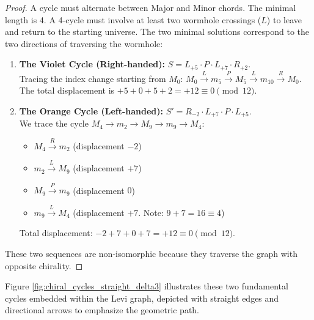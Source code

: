 \documentclass[12pt,letterpaper]{amsart}
\begin{document}
\begin{proof}
A cycle must alternate between Major and Minor chords. The minimal length is 4. A 4-cycle must involve at least two wormhole crossings (\texorpdfstring{$L$}{L}) to leave and return to the starting universe.
The two minimal solutions correspond to the two directions of traversing the wormhole:

\begin{enumerate}
    \item \textbf{The Violet Cycle (Right-handed):} $ S = L_{+5} \cdot P \cdot L_{+7} \cdot R_{+2} $.\\
    Tracing the index change starting from $M_0$: 
    $M_0 \xrightarrow{L} m_5 \xrightarrow{P} M_5 \xrightarrow{L} m_{10} \xrightarrow{R} M_0$.
    The total displacement is $+5 + 0 + 5 + 2 = +12 \equiv 0 \pmod{12}$.
    
    \item \textbf{The Orange Cycle (Left-handed):} $ S' = R_{-2} \cdot L_{+7} \cdot P \cdot L_{+5} $. \\
    We trace the cycle $M_4 \to m_2 \to M_9 \to m_9 \to M_4$:
    \begin{itemize}
        \item $M_4 \xrightarrow{R} m_2$ (displacement $-2$)
        \item $m_2 \xrightarrow{L} M_9$ (displacement $+7$)
        \item $M_9 \xrightarrow{P} m_9$ (displacement $0$)
        \item $m_9 \xrightarrow{L} M_4$ (displacement $+7$. Note: $9+7=16 \equiv 4$)
    \end{itemize}
    Total displacement: $-2 + 7 + 0 + 7 = +12 \equiv 0 \pmod{12}$.
\end{enumerate}
These two sequences are non-isomorphic because they traverse the graph with opposite chirality.
\end{proof}

Figure \ref{fig:chiral_cycles_straight_delta3} illustrates these two fundamental cycles embedded within the Levi graph, depicted with straight edges and directional arrows to emphasize the geometric path.
\end{document}
